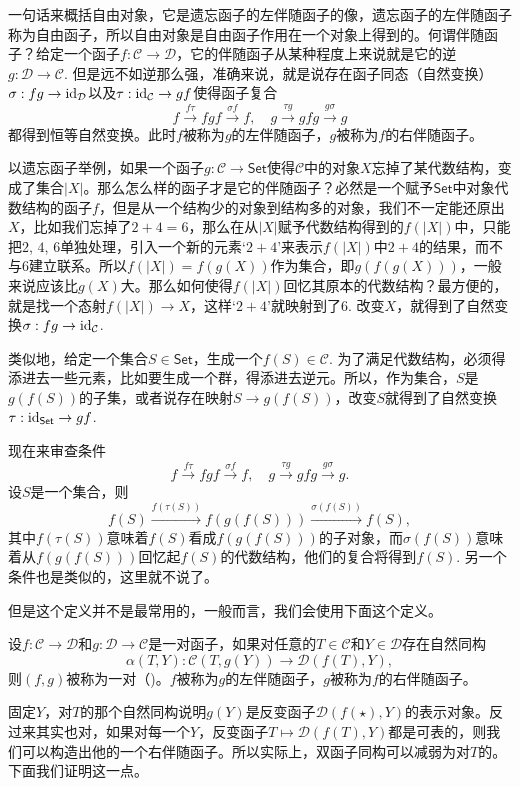 一句话来概括自由对象，它是遗忘函子的左伴随函子的像，遗忘函子的左伴随函子称为自由函子，所以自由对象是自由函子作用在一个对象上得到的。何谓伴随函子？给定一个函子$f:\mathcal{C}\to \mathcal{D}$，它的伴随函子从某种程度上来说就是它的逆$g:\mathcal{D}\to \mathcal{C}$. 但是远不如逆那么强，准确来说，就是说存在函子同态（自然变换）$\sigma:fg\to \operatorname{id}_{\mathcal{D}}$以及$\tau:\operatorname{id}_{\mathcal{C}}\to gf$使得函子复合
\[
	f\xrightarrow{f\tau}fgf\xrightarrow{\sigma f}f,\quad g\xrightarrow{\tau g}gfg\xrightarrow{g\sigma}g
\]
都得到恒等自然变换。此时$f$被称为$g$的左伴随函子，$g$被称为$f$的右伴随函子。

以遗忘函子举例，如果一个函子$g:\mathcal{C}\to \mathsf{Set}$使得$\mathcal{C}$中的对象$X$忘掉了某代数结构，变成了集合$|X|$。那么怎么样的函子才是它的伴随函子？必然是一个赋予$\mathsf{Set}$中对象代数结构的函子$f$，但是从一个结构少的对象到结构多的对象，我们不一定能还原出$X$，比如我们忘掉了$2+4=6$，那么在从$|X|$赋予代数结构得到的$f(|X|)$中，只能把$2$, $4$, $6$单独处理，引入一个新的元素`$2+4$'来表示$f(|X|)$中$2+4$的结果，而不与$6$建立联系。所以$f(|X|)=f(g(X))$作为集合，即$g(f(g(X)))$，一般来说应该比$g(X)$大。那么如何使得$f(|X|)$回忆其原本的代数结构？最方便的，就是找一个态射$f(|X|)\to X$，这样`$2+4$'就映射到了$6$. 改变$X$，就得到了自然变换$\sigma:fg\to \operatorname{id}_\mathcal{C}$.

类似地，给定一个集合$S\in \mathsf{Set}$，生成一个$f(S)\in \mathcal{C}$. 为了满足代数结构，必须得添进去一些元素，比如要生成一个群，得添进去逆元。所以，作为集合，$S$是$g(f(S))$的子集，或者说存在映射$S\to g(f(S))$，改变$S$就得到了自然变换$\tau:\operatorname{id}_{\mathsf{Set}}\to gf$.

现在来审查条件
\[
	f\xrightarrow{f\tau}fgf\xrightarrow{\sigma f}f,\quad g\xrightarrow{\tau g}gfg\xrightarrow{g\sigma}g.
\]
设$S$是一个集合，则
\[
	f(S)\xrightarrow{f(\tau(S))}f(g(f(S)))\xrightarrow{\sigma(f(S))}f(S),
\]
其中$f(\tau(S))$意味着$f(S)$看成$f(g(f(S)))$的子对象，而$\sigma(f(S))$意味着从$f(g(f(S)))$回忆起$f(S)$的代数结构，他们的复合将得到$f(S)$. 另一个条件也是类似的，这里就不说了。

但是这个定义并不是最常用的，一般而言，我们会使用下面这个定义。

\para 设$f:\mathcal{C}\to \mathcal{D}$和$g:\mathcal{D}\to \mathcal{C}$是一对函子，如果对任意的$T\in\mathcal{C}$和$Y\in\mathcal{D}$存在自然同构
\[
	\alpha(T,Y):\mathcal{C}(T,g(Y))\to \mathcal{D}(f(T),Y),
\]
则$(f,g)$被称为一对（)。$f$被称为$g$的左伴随函子，$g$被称为$f$的右伴随函子。

固定$Y$，对$T$的那个自然同构说明$g(Y)$是反变函子$\mathcal{D}(f(\star),Y)$的表示对象。反过来其实也对，如果对每一个$Y$，反变函子$T\mapsto {\mathcal{D}}(f(T),Y)$都是可表的，则我们可以构造出他的一个右伴随函子。所以实际上，双函子同构可以减弱为对$T$的。下面我们证明这一点。

